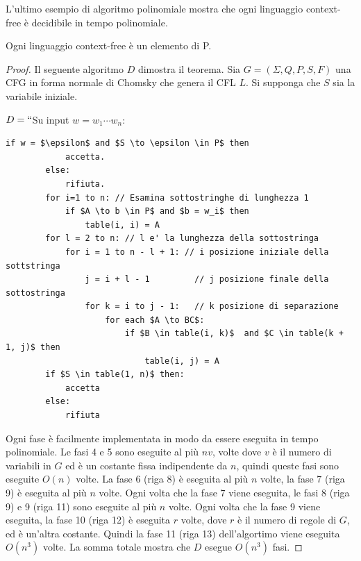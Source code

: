 \documentclass[12pt]{report}
\newcounter{theorem}
\begin{document}
L'ultimo esempio di algoritmo polinomiale mostra che ogni linguaggio context-free è decidibile in tempo polinomiale.
\begin{theorem}{}{}
	Ogni linguaggio context-free è un elemento di P.
\end{theorem}
\begin{proof}
	Il seguente algoritmo $D$ dimostra il teorema. Sia $G = \left(\Sigma, Q, P, S, F\right)$ una CFG in forma normale di Chomsky che genera il CFL $L$. Si supponga che $S$ sia la variabile iniziale.

	$D = ``$Su input $w = w_1\cdots w_n$:
	\begin{lstlisting}[style=pseudocode, mathescape=true]
		if w = $\epsilon$ and $S \to \epsilon \in P$ then
			accetta.
		else:
			rifiuta.
		for i=1 to n: // Esamina sottostringhe di lunghezza 1
			if $A \to b \in P$ and $b = w_i$ then
				table(i, i) = A
		for l = 2 to n: // l e' la lunghezza della sottostringa
			for i = 1 to n - l + 1: // i posizione iniziale della sottstringa
				j = i + l - 1         // j posizione finale della sottostringa
				for k = i to j - 1:   // k posizione di separazione
					for each $A \to BC$:
						if $B \in table(i, k)$  and $C \in table(k + 1, j)$ then
							table(i, j) = A
		if $S \in table(1, n)$ then:
			accetta
		else:
			rifiuta
	\end{lstlisting}
	Ogni fase è facilmente implementata in modo da essere eseguita in tempo polinomiale. Le fasi 4 e 5 sono eseguite al più $nv$, volte dove $v$ è il numero di variabili in $G$ ed è un costante fissa indipendente da $n$, quindi queste fasi sono eseguite $O(n)$ volte. La fase 6 (riga 8) è eseguita al più $n$ volte, la fase 7 (riga 9) è eseguita al più $n$ volte. Ogni volta che la fase 7 viene eseguita, le fasi 8 (riga 9) e 9 (riga 11) sono eseguite al più $n$ volte. Ogni volta che la fase 9 viene eseguita, la fase 10 (riga 12) è eseguita $r$ volte, dove $r$ è il numero di regole di $G$, ed è un'altra costante. Quindi la fase 11 (riga 13) dell'algortimo viene eseguita $O(n^3)$ volte. La somma totale mostra che $D$ esegue $O(n^3)$ fasi.
\end{proof}
\end{document}
